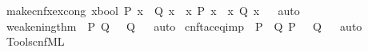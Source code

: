\begin{isabellebody}
{\isafoldproof}%
%
\isadelimproof
%
\endisadelimproof
\isanewline
{}\isamarkupfalse%
\ make{\isacharunderscore}{\kern0pt}cnfx{\isacharunderscore}{\kern0pt}ex{\isacharunderscore}{\kern0pt}cong{\isacharcolon}{\kern0pt}\ {\isachardoublequoteopen}{\isacharparenleft}{\kern0pt}{\isasymforall}{\isacharparenleft}{\kern0pt}x{\isacharcolon}{\kern0pt}{\isacharcolon}{\kern0pt}bool{\isacharparenright}{\kern0pt}{\isachardot}{\kern0pt}\ P\ x\ {\isacharequal}{\kern0pt}\ Q\ x{\isacharparenright}{\kern0pt}\ {\isasymLongrightarrow}\ {\isacharparenleft}{\kern0pt}{\isasymexists}x{\isachardot}{\kern0pt}\ P\ x{\isacharparenright}{\kern0pt}\ {\isacharequal}{\kern0pt}\ {\isacharparenleft}{\kern0pt}{\isasymexists}x{\isachardot}{\kern0pt}\ Q\ x{\isacharparenright}{\kern0pt}{\isachardoublequoteclose}%
\isadelimproof
\ %
\endisadelimproof
%
\isatagproof
{}\isamarkupfalse%
\ auto%
\endisatagproof
{\isafoldproof}%
%
\isadelimproof
%
\endisadelimproof
\isanewline
\isanewline
{}\isamarkupfalse%
\ weakening{\isacharunderscore}{\kern0pt}thm{\isacharcolon}{\kern0pt}\ {\isachardoublequoteopen}{\isacharbrackleft}{\kern0pt}{\isacharbar}{\kern0pt}\ P{\isacharsemicolon}{\kern0pt}\ Q\ {\isacharbar}{\kern0pt}{\isacharbrackright}{\kern0pt}\ {\isacharequal}{\kern0pt}{\isacharequal}{\kern0pt}{\isachargreater}{\kern0pt}\ Q{\isachardoublequoteclose}%
\isadelimproof
\ %
\endisadelimproof
%
\isatagproof
{}\isamarkupfalse%
\ auto%
\endisatagproof
{\isafoldproof}%
%
\isadelimproof
%
\endisadelimproof
\isanewline
\isanewline
{}\isamarkupfalse%
\ cnftac{\isacharunderscore}{\kern0pt}eq{\isacharunderscore}{\kern0pt}imp{\isacharcolon}{\kern0pt}\ {\isachardoublequoteopen}{\isacharbrackleft}{\kern0pt}{\isacharbar}{\kern0pt}\ P\ {\isacharequal}{\kern0pt}\ Q{\isacharsemicolon}{\kern0pt}\ P\ {\isacharbar}{\kern0pt}{\isacharbrackright}{\kern0pt}\ {\isacharequal}{\kern0pt}{\isacharequal}{\kern0pt}{\isachargreater}{\kern0pt}\ Q{\isachardoublequoteclose}%
\isadelimproof
\ %
\endisadelimproof
%
\isatagproof
{}\isamarkupfalse%
\ auto%
\endisatagproof
{\isafoldproof}%
%
\isadelimproof
%
\endisadelimproof
\isanewline
\isanewline
{}\isamarkupfalse%
\isanewline
%
\isadelimML
\isanewline
%
\endisadelimML
%
\isatagML
{}\isamarkupfalse%
\ {\isacartoucheopen}Tools{\isacharslash}{\kern0pt}cnf{\isachardot}{\kern0pt}ML{\isacartoucheclose}%
\endisatagML
{\isafoldML}%
%
\isadelimML
%
\endisadelimML
%
\isadelimdocument
%
\endisadelimdocument
%
\isatagdocument
%
\end{isabellebody}
